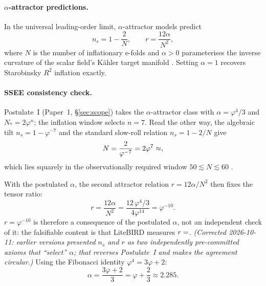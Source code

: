 \paragraph{$\alpha$-attractor predictions.}
In the universal leading-order limit, $\alpha$-attractor models predict
\begin{equation}
  n_s = 1 - \frac{2}{N}, \qquad
  r   = \frac{12\alpha}{N^{2}},
  \label{eq:alpha_attractor}
\end{equation}
where $N$ is the number of inflationary e-folds and $\alpha > 0$
parameterises the inverse curvature of the scalar field's K\"{a}hler target
manifold \citep{KalloshLinde2013,Ferrara2013}.
Setting $\alpha = 1$ recovers Starobinsky $R^{2}$ inflation \citep{Starobinsky1980} exactly.

\paragraph{SSEE consistency check.}
Postulate~I (Paper~1, \S\ref{sec:scope}) takes the $\alpha$-attractor class with
$\alpha=\varphi^4/3$ and $N_*=2\varphi^n$; the inflation window selects $n=7$.
Read the other way, the algebraic tilt $n_s = 1-\varphi^{-7}$ and the standard
slow-roll relation $n_s = 1 - 2/N$ give
\begin{equation}
  N = \frac{2}{\varphi^{-7}} = 2\varphi^{7} \approx \val{dos_phi7_d6},
  \label{eq:N_ssee}
\end{equation}
which lies squarely in the observationally required window $50\lesssim N\lesssim 60$
\citep{Akrami2020}.

With the postulated $\alpha$, the second attractor relation $r = 12\alpha/N^2$ then
fixes the tensor ratio:
\begin{equation}
  r = \frac{12\alpha}{N^{2}}
    = \frac{12\,\varphi^{4}/3}{4\varphi^{14}}
    = \varphi^{-10}.
  \label{eq:alpha_ssee}
\end{equation}
$r=\varphi^{-10}$ is therefore a consequence of the postulated $\alpha$, not an
independent check of it: the falsifiable content is that LiteBIRD measures
$r=\val{R_TENSOR_d6}$. \emph{(Corrected 2026-10-11: earlier versions presented
$n_s$ and $r$ as two independently pre-committed axioms that ``select'' $\alpha$;
that reverses Postulate~I and makes the agreement circular.)}
Using the Fibonacci identity $\varphi^{4} = 3\varphi + 2$:
\begin{equation}
  \alpha = \frac{3\varphi + 2}{3} = \varphi + \frac{2}{3} \approx 2.285.
  \label{eq:alpha_fibonacci}
\end{equation}


